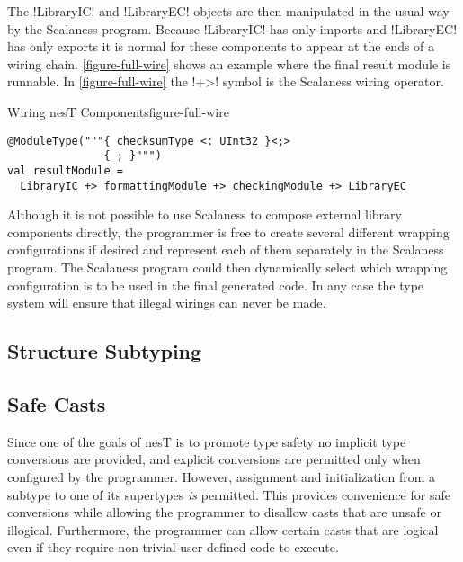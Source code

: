 The !LibraryIC! and !LibraryEC! objects are then manipulated in the usual way by the Scalaness
program. Because !LibraryIC! has only imports and !LibraryEC! has only exports it is normal for
these components to appear at the ends of a wiring chain. \autoref{figure-full-wire} shows an
example where the final result module is runnable. In \autoref{figure-full-wire} the !+>! symbol
is the Scalaness wiring operator.

\singlespace
\begin{fpfig}[tbhp]{Wiring nesT Components}{figure-full-wire}
{
\begin{lstlisting}[language=scalaness]
@ModuleType("""{ checksumType <: UInt32 }<;>
               { ; }""")
val resultModule =
  LibraryIC +> formattingModule +> checkingModule +> LibraryEC
\end{lstlisting}
}
\end{fpfig}
\primaryspacing

Although it is not possible to use Scalaness to compose external library components directly,
the programmer is free to create several different wrapping configurations if desired and
represent each of them separately in the Scalaness program. The Scalaness program could then
dynamically select which wrapping configuration is to be used in the final generated code. In
any case the type system will ensure that illegal wirings can never be made.

\subsection{Structure Subtyping}
\label{section-structure-subtyping}


\subsection{Safe Casts}
\label{section-safe-casts}

Since one of the goals of nesT is to promote type safety no implicit type conversions are
provided, and explicit conversions are permitted only when configured by the programmer.
However, assignment and initialization from a subtype to one of its supertypes \emph{is}
permitted. This provides convenience for safe conversions while allowing the programmer to
disallow casts that are unsafe or illogical. Furthermore, the programmer can allow certain casts
that are logical even if they require non-trivial user defined code to execute.

